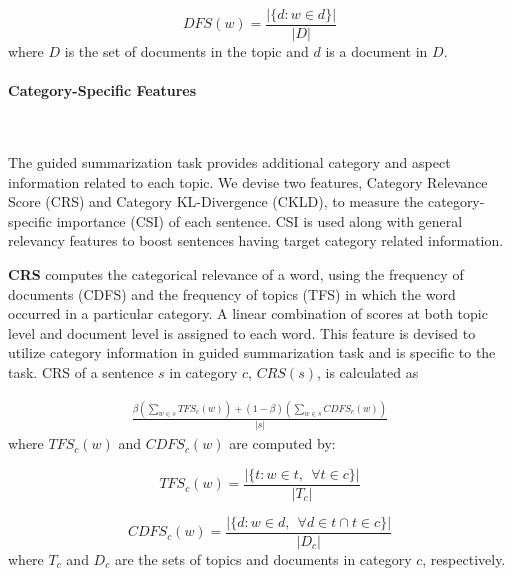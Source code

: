 \begin{displaymath}
DFS(w) = \frac{ | \{ d:w \in d\} | }{|D|}
\end{displaymath}
where $D$ is the set of documents in the topic and $d$ is a document in $D$.

\paragraph{Category-Specific Features}\ \vspace{1mm}

The guided summarization task provides additional category and aspect information related to each topic. We devise two features, Category Relevance Score (CRS) and Category KL-Divergence (CKLD), to measure the category-specific importance (CSI) of each sentence. CSI is used along with general relevancy features to boost sentences having target category related information.

\textbf{CRS} computes the categorical relevance of a word, using the frequency of documents (CDFS) and the frequency of topics (TFS) in which the word occurred in a particular category. A linear combination of scores at both topic level and document level is assigned to each word. This feature is devised to utilize category information in guided summarization task and is specific to the task. CRS of a sentence $s$ in category $c$, $CRS(s)$, is calculated as

\begin{eqnarray*}
\frac{\beta(\sum_{w \in s} TFS_c(w)) + (1-\beta)(\sum_{w \in s} CDFS_c(w))}{|s|} 
\end{eqnarray*}
where $TFS_c(w)$ and $CDFS_c(w)$ are computed by:

\begin{displaymath}
TFS_c(w) = \frac{ | \{ t:w \in t, ~~\forall t \in c \} | }{|T_c|} 
\end{displaymath}

\begin{displaymath}
CDFS_c(w) = \frac{ | \{ d:w \in d, ~~\forall d \in t \cap t \in c \} | }{|D_c|} 
\end{displaymath}
where $T_c$ and $D_c$ are the sets of topics and documents in category $c$, respectively.

